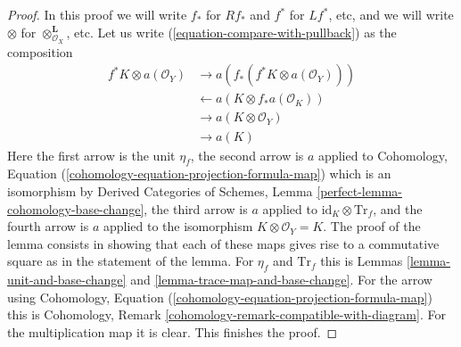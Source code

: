 \documentclass[10pt,a4paper]{amsart}
\theoremstyle{plain}
\theoremstyle{definition}
\theoremstyle{remark}
\numberwithin{equation}{subsection}
\begin{document}
\begin{proof}
In this proof we will write $f_*$ for $Rf_*$ and $f^*$ for $Lf^*$, etc,
and we will write $\otimes$ for $\otimes^\mathbf{L}_{\mathcal{O}_X}$, etc.
Let us write (\ref{equation-compare-with-pullback}) as the composition
\begin{align*}
f^*K \otimes a(\mathcal{O}_Y)
& \to
a(f_*(f^*K \otimes a(\mathcal{O}_Y))) \\
& \leftarrow
a(K \otimes f_*a(\mathcal{O}_K)) \\
& \to
a(K \otimes \mathcal{O}_Y) \\
& \to
a(K)
\end{align*}
Here the first arrow is the unit $\eta_f$, the second arrow is $a$
applied to Cohomology, Equation
(\ref{cohomology-equation-projection-formula-map}) which is an
isomorphism by Derived Categories of Schemes, Lemma
\ref{perfect-lemma-cohomology-base-change}, the third arrow is
$a$ applied to $\text{id}_K \otimes \text{Tr}_f$, and the fourth
arrow is $a$ applied to the isomorphism $K \otimes \mathcal{O}_Y = K$.
The proof of the lemma consists in showing that each of these
maps gives rise to a commutative square as in the statement of the lemma.
For $\eta_f$ and $\text{Tr}_f$ this is
Lemmas \ref{lemma-unit-and-base-change} and
\ref{lemma-trace-map-and-base-change}.
For the arrow using Cohomology, Equation
(\ref{cohomology-equation-projection-formula-map})
this is Cohomology, Remark \ref{cohomology-remark-compatible-with-diagram}.
For the multiplication map it is clear. This finishes the proof.
\end{proof}
\end{document}
